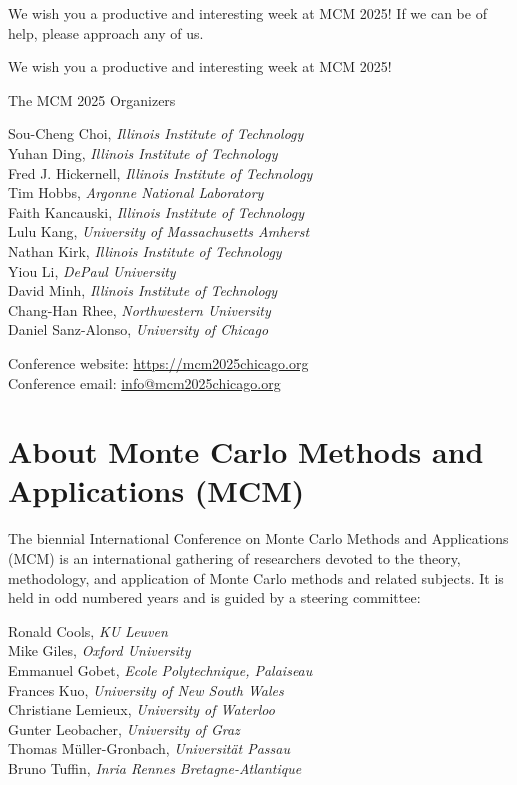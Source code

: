 We wish you a productive and interesting week at MCM 2025! If we can be of help, please approach any of us.

We wish you a productive and interesting week at MCM 2025!


\vspace{5ex}

The MCM 2025 Organizers 

\smallskip

Sou-Cheng Choi, \emph{Illinois Institute of Technology} \\
Yuhan Ding, \emph{Illinois Institute of Technology} \\
Fred J. Hickernell, \emph{Illinois Institute of Technology} \\
Tim Hobbs, \emph{Argonne National Laboratory} \\
Faith Kancauski, \emph{Illinois Institute of Technology} \\
Lulu Kang, \emph{University of Massachusetts Amherst} \\
Nathan Kirk, \emph{Illinois Institute of Technology} \\
Yiou Li, \emph{DePaul University} \\
David Minh, \emph{Illinois Institute of Technology} \\
Chang-Han Rhee, \emph{Northwestern University} \\
Daniel Sanz-Alonso, \emph{University of Chicago}




\vspace{0.5cm}
Conference website: \url{https://mcm2025chicago.org} \\
Conference email: \url{info@mcm2025chicago.org}

\thispagestyle{empty} \tableofcontents

\section{About Monte Carlo Methods and Applications (MCM)}


The biennial International Conference on Monte Carlo Methods and Applications (MCM) is an international gathering of researchers devoted to the theory, methodology, and application of Monte Carlo methods and related subjects. It is held in odd numbered years and is guided by a steering committee: 

Ronald Cools, \emph{KU Leuven} \\
Mike Giles, \emph{Oxford University} \\
Emmanuel Gobet, \emph{Ecole Polytechnique, Palaiseau} \\
Frances Kuo, \emph{University of New South Wales} \\
Christiane Lemieux, \emph{University of Waterloo} \\
Gunter Leobacher, \emph{University of Graz} \\
Thomas Müller-Gronbach, \emph{Universität Passau} \\
Bruno Tuffin, \emph{Inria Rennes Bretagne-Atlantique}

